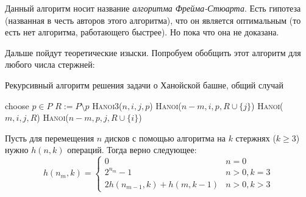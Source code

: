Данный алгоритм носит название \emph{алгоритма Фрейма-Стюарта}. Есть гипотеза (названная в честь авторов этого алгоритма), что он является оптимальным (то есть нет алгоритма, работающего быстрее). Но пока что она не доказана.

Дальше пойдут теоретические изыски. Попробуем обобщить этот алгоритм для любого числа стержней:

\begin{algorithm}[H]
	\caption{Рекурсивный алгоритм решения задачи о Ханойской башне, общий случай}
	\begin{algorithmic}[1]
		\State {}
		\State choose $p \in P$
		\State $R \mathrel{:=} P \setminus p$
		\State \textsc{Hanoi3}($n,i,j,p$)
		\Else
		\State \textsc{Hanoi}($n-m,i,p,R \cup \{j\}$)
		\State \textsc{Hanoi}($m,i,j,R$)
		\State \textsc{Hanoi}($n-m,p,j,R \cup \{i\}$)
		\EndIf
		\EndIf
		\EndFunction
	\end{algorithmic}
\end{algorithm}

Пусть для перемещения $n$ дисков с помощью алгоритма на $k$ стержнях ($k \geq 3$) нужно $h(n,k)$ операций. Тогда верно следующее:
\[h(n_m, k) = \begin{cases}
0& n=0\\
2^{n_m}-1& n>0, k=3\\
2h(n_{m-1}, k) + h(m, k-1)& n > 0, k > 3
\end{cases}\]
